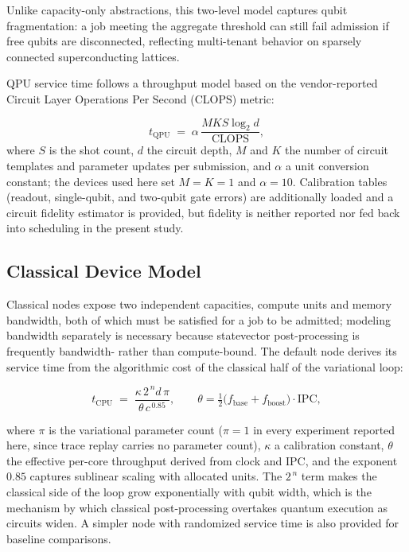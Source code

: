 Unlike capacity-only abstractions, this two-level model captures qubit fragmentation: a job meeting the aggregate threshold can still fail admission if free qubits are disconnected, reflecting multi-tenant behavior on sparsely connected superconducting lattices.


QPU service time follows a throughput model based on the vendor-reported Circuit Layer Operations Per Second (CLOPS) metric:

\begin{equation}
\label{eq:qpu-time}
t_{\mathrm{QPU}} \;=\; \alpha\,\frac{M K S \log_2 d}{\mathrm{CLOPS}},
\end{equation}
where $S$ is the shot count, $d$ the circuit depth, $M$ and $K$ the number of circuit templates and parameter updates per submission, and $\alpha$ a unit conversion constant; the devices used here set $M = K = 1$ and $\alpha = 10$. Calibration tables (readout, single-qubit, and two-qubit gate errors) are additionally loaded and a circuit fidelity estimator is provided, but fidelity is neither reported nor fed back into scheduling in the present study. 

\subsection{Classical Device Model}
\label{sec:arch-cpu}

Classical nodes expose two independent capacities, compute units and memory bandwidth, both of which must be satisfied for a job to be admitted; modeling bandwidth separately is necessary because statevector post-processing is frequently bandwidth- rather than compute-bound. The default node derives its service time from the algorithmic cost of the classical half of the variational loop:

\begin{equation}
\label{eq:cpu-time}
t_{\mathrm{CPU}} \;=\; \frac{\kappa\, 2^{\,n} d\, \pi}{\theta\, c^{\,0.85}},
\qquad
\theta = \tfrac{1}{2}\bigl(f_{\mathrm{base}} + f_{\mathrm{boost}}\bigr)\cdot\mathrm{IPC},
\end{equation}

where $\pi$ is the variational parameter count ($\pi = 1$ in every experiment reported here, since trace replay carries no parameter count), $\kappa$ a calibration constant, $\theta$ the effective per-core throughput derived from clock and IPC, and the exponent $0.85$ captures sublinear scaling with allocated units. The $2^{\,n}$ term makes the classical side of the loop grow exponentially with qubit width, which is the mechanism by which classical post-processing overtakes quantum execution as circuits widen. A simpler node with randomized service time is also provided for baseline comparisons.

